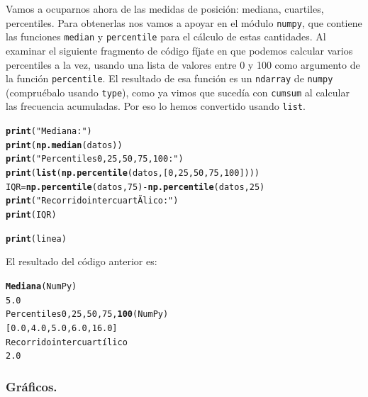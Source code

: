 \documentclass[10pt,a4paper]{article}\usepackage[]{graphicx}\usepackage[]{color}
\makeatletter
\newcommand{\hlstr}[1]{\textcolor[rgb]{0.192,0.494,0.8}{#1}}%
\newcommand{\hlkwd}[1]{\textcolor[rgb]{0.737,0.353,0.396}{\textbf{#1}}}%
\newenvironment{kframe}{%
 \def\at@end@of@kframe{}%
 \ifinner\ifhmode%
  \def\at@end@of@kframe{\end{minipage}}%
  \begin{minipage}{\columnwidth}%
 \fi\fi%
 \def\FrameCommand##1{\hskip\@totalleftmargin \hskip-\fboxsep
 \colorbox{shadecolor}{##1}\hskip-\fboxsep
     \hskip-\linewidth \hskip-\@totalleftmargin \hskip\columnwidth}%
 \MakeFramed {\advance\hsize-\width
   \@totalleftmargin\z@ \linewidth\hsize
   \@setminipage}}%
 {\par\unskip\endMakeFramed%
 \at@end@of@kframe}
\newenvironment{knitrout}{}{} %
\newcounter {cont01}
\makeatother
\begin{document}
Vamos a ocuparnos ahora de las medidas de posición: mediana, cuartiles, percentiles. Para obtenerlas nos vamos a apoyar en el módulo {\tt numpy}, que contiene las funciones {\tt median} y {\tt percentile} para el cálculo de estas cantidades. Al examinar el siguiente fragmento de código fíjate en que podemos calcular varios percentiles a la vez, usando una lista de valores entre 0 y 100 como argumento de la función {\tt percentile}. El resultado de esa función es un {\tt ndarray} de {\tt numpy} (compruébalo usando {\tt type}), como ya vimos que sucedía con {\tt cumsum} al calcular las frecuencia acumuladas. Por eso lo hemos convertido usando {\tt list}.
\begin{knitrout}
\color{fgcolor}\begin{kframe}
\begin{alltt}
\hlkwd{print}(\hlstr{"Mediana:"})
\hlkwd{print}(\hlkwd{np.median}(datos))
\hlkwd{print}(\hlstr{"Percentiles 0, 25, 50, 75, 100:"})
\hlkwd{print}(\hlkwd{list}(\hlkwd{np.percentile}(datos, [0, 25, 50, 75, 100])))
IQR = \hlkwd{np.percentile}(datos, 75) - \hlkwd{np.percentile}(datos, 25)
\hlkwd{print}(\hlstr{"Recorrido intercuartÃ­lico:"})
\hlkwd{print}(IQR)

\hlkwd{print}(linea)
\end{alltt}
\end{kframe}
\end{knitrout}
El resultado del código anterior es:

\begin{knitrout}
\color{fgcolor}\begin{kframe}
\begin{alltt}
\hlkwd{Mediana} (NumPy)
5.0
Percentiles 0, 25, 50, 75, \hlkwd{100}  (NumPy)
[0.0, 4.0, 5.0, 6.0, 16.0]
Recorrido intercuartílico
2.0
\end{alltt}
\end{kframe}
\end{knitrout}

\subsubsection*{Gráficos.}
\label{tut02:subsubsec:graficos}
\end{document}
